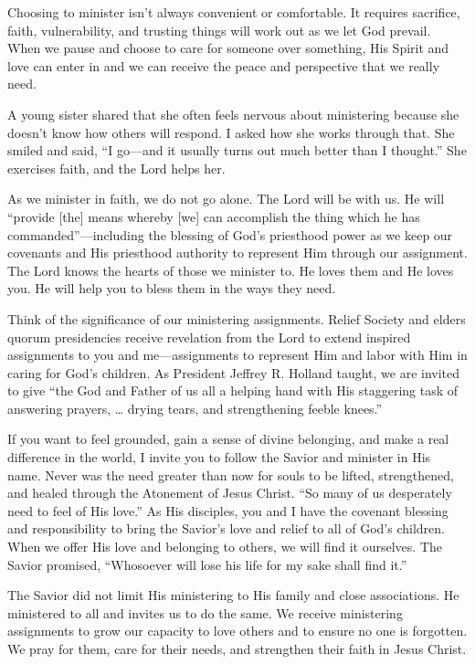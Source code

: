 \documentclass[letterpaper, 11pt]{report}
\begin{document}
Choosing to minister isn’t always convenient or comfortable. It requires sacrifice, faith, vulnerability, and trusting things will work out as we let God prevail. When we pause and choose to care for someone over something, His Spirit and love can enter in and we can receive the peace and perspective that we really need.

A young sister shared that she often feels nervous about ministering because she doesn’t know how others will respond. I asked how she works through that. She smiled and said, “I go—and it usually turns out much better than I thought.” She exercises faith, and the Lord helps her.

As we minister in faith, we do not go alone. The Lord will be with us. He will “provide [the] means whereby [we] can accomplish the thing which he has commanded”—including the blessing of God’s priesthood power as we keep our covenants and His priesthood authority to represent Him through our assignment. The Lord knows the hearts of those we minister to. He loves them and He loves you. He will help you to bless them in the ways they need.

Think of the significance of our ministering assignments. Relief Society and elders quorum presidencies receive revelation from the Lord to extend inspired assignments to you and me—assignments to represent Him and labor with Him in caring for God’s children. As President Jeffrey R. Holland taught, we are invited to give “the God and Father of us all a helping hand with His staggering task of answering prayers, … drying tears, and strengthening feeble knees.”

If you want to feel grounded, gain a sense of divine belonging, and make a real difference in the world, I invite you to follow the Savior and minister in His name. Never was the need greater than now for souls to be lifted, strengthened, and healed through the Atonement of Jesus Christ. “So many of us desperately need to feel of His love.” As His disciples, you and I have the covenant blessing and responsibility to bring the Savior’s love and relief to all of God’s children. When we offer His love and belonging to others, we will find it ourselves. The Savior promised, “Whosoever will lose his life for my sake shall find it.”

The Savior did not limit His ministering to His family and close associations. He ministered to all and invites us to do the same. We receive ministering assignments to grow our capacity to love others and to ensure no one is forgotten. We pray for them, care for their needs, and strengthen their faith in Jesus Christ.
\end{document}
